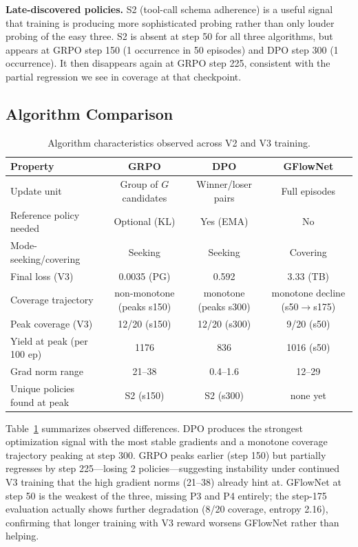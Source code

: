 \documentclass{article}
\begin{document}
\textbf{Late-discovered policies.}
S2 (tool-call schema adherence) is a useful signal that training is producing more sophisticated probing rather than only louder probing of the easy three. S2 is absent at step 50 for all three algorithms, but appears at GRPO step 150 (1 occurrence in 50 episodes) and DPO step 300 (1 occurrence). It then disappears again at GRPO step 225, consistent with the partial regression we see in coverage at that checkpoint.

\subsection{Algorithm Comparison}

\begin{table}[t]
\centering
\caption{Algorithm characteristics observed across V2 and V3 training.}
\label{tab:algo_comparison}
\small
\begin{tabular}{lccc}
\toprule
\textbf{Property} & \textbf{GRPO} & \textbf{DPO} & \textbf{GFlowNet} \\
\midrule
Update unit & Group of $G$ candidates & Winner/loser pairs & Full episodes \\
Reference policy needed & Optional (KL) & Yes (EMA) & No \\
Mode-seeking/covering & Seeking & Seeking & Covering \\
\midrule
Final loss (V3) & 0.0035 (PG) & 0.592 & 3.33 (TB) \\
Coverage trajectory & non-monotone (peaks s150) & monotone (peaks s300) & monotone decline (s50$\to$s175) \\
Peak coverage (V3) & 12/20 (s150) & 12/20 (s300) & 9/20 (s50) \\
Yield at peak (per 100 ep) & 1176 & 836 & 1016 (s50) \\
Grad norm range & 21--38 & 0.4--1.6 & 12--29 \\
Unique policies found at peak & S2 (s150) & S2 (s300) & none yet \\
\bottomrule
\end{tabular}
\end{table}

Table~\ref{tab:algo_comparison} summarizes observed differences. DPO produces the strongest optimization signal with the most stable gradients and a monotone coverage trajectory peaking at step 300. GRPO peaks earlier (step 150) but partially regresses by step 225---losing 2 policies---suggesting instability under continued V3 training that the high gradient norms (21--38) already hint at. GFlowNet at step 50 is the weakest of the three, missing P3 and P4 entirely; the step-175 evaluation actually shows further degradation (8/20 coverage, entropy 2.16), confirming that longer training with V3 reward worsens GFlowNet rather than helping.
\end{document}
